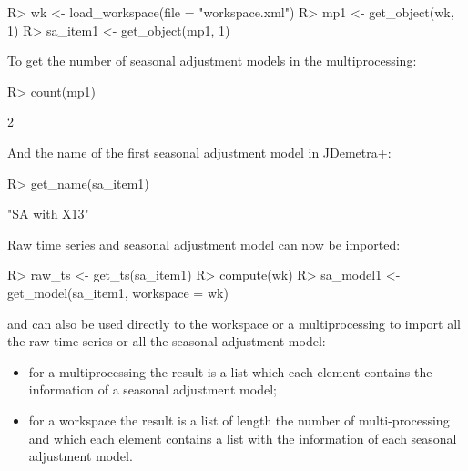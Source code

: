 \documentclass[article]{jss}
\providecommand{\tightlist}{%
  \setlength{\itemsep}{0pt}\setlength{\parskip}{0pt}}
\begin{document}
\begin{CodeChunk}

\begin{CodeInput}
R> wk <- load_workspace(file =  "workspace.xml")
R> mp1 <- get_object(wk, 1)
R> sa_item1 <- get_object(mp1, 1)
\end{CodeInput}
\end{CodeChunk}

To get the number of seasonal adjustment models in the multiprocessing:

\begin{CodeChunk}

\begin{CodeInput}
R> count(mp1)
\end{CodeInput}

\begin{CodeOutput}
[1] 2
\end{CodeOutput}
\end{CodeChunk}

And the name of the first seasonal adjustment model in JDemetra+:

\begin{CodeChunk}

\begin{CodeInput}
R> get_name(sa_item1) 
\end{CodeInput}

\begin{CodeOutput}
[1] "SA with X13"
\end{CodeOutput}
\end{CodeChunk}

Raw time series and seasonal adjustment model can now be imported:

\begin{CodeChunk}

\begin{CodeInput}
R> raw_ts <- get_ts(sa_item1)
R> compute(wk)
R> sa_model1 <- get_model(sa_item1, workspace = wk)
\end{CodeInput}
\end{CodeChunk}

 and  can also be used directly to the
workspace or a multiprocessing to import all the raw time series or all
the seasonal adjustment model:

\begin{itemize}
\tightlist
\item
  for a multiprocessing the result is a list which each element contains
  the information of a seasonal adjustment model;\\
\item
  for a workspace the result is a list of length the number of
  multi-processing and which each element contains a list with the
  information of each seasonal adjustment model.
\end{itemize}
\end{document}
